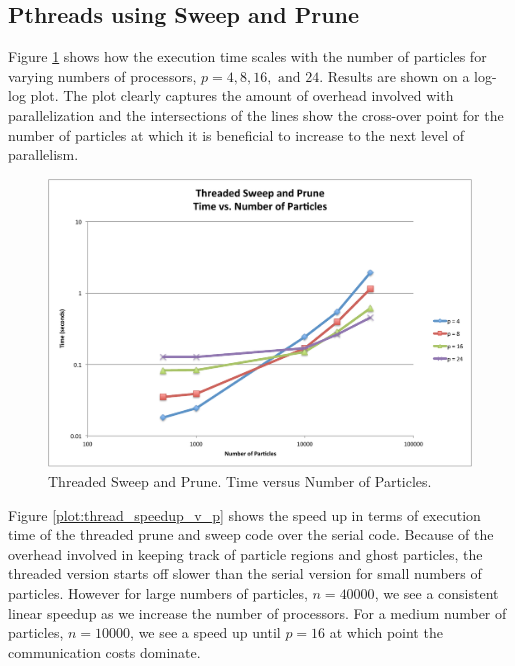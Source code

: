 \documentclass[11pt]{article} %
\begin{document}
\subsection{Pthreads using Sweep and Prune}
Figure \ref{plot:thread_t_v_n} shows how the execution time scales
with the number of particles for varying numbers of processors, $p=4,8,16,\text{ and }24$.
Results are shown on a log-log plot. The plot clearly captures the
amount of overhead involved with parallelization and the intersections
of the lines show the cross-over point for the number of particles
at which it is beneficial to increase to the next level of parallelism. 

\begin{figure}
\begin{centering}
\includegraphics[width=0.5\paperwidth]{figures/thread_t_v_n}
\par\end{centering}

\caption{Threaded Sweep and Prune. Time versus Number of Particles.}
\label{plot:thread_t_v_n}
\end{figure}


Figure \ref{plot:thread_speedup_v_p} shows the speed up in terms
of execution time of the threaded prune and sweep code over the serial
code. Because of the overhead involved in keeping track of particle
regions and ghost particles, the threaded version starts off slower
than the serial version for small numbers of particles. However for
large numbers of particles, $n=40000$, we see a consistent linear
speedup as we increase the number of processors. For a medium number
of particles, $n=10000$, we see a speed up until $p=16$ at which
point the communication costs dominate. 
\end{document}

